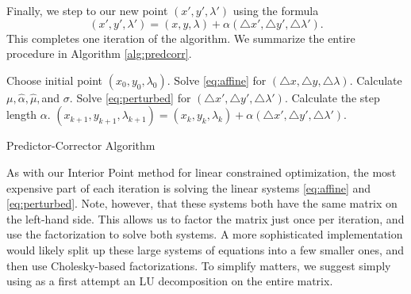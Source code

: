 Finally, we step to our new point $(x', y', \lambda')$ using the formula
\[
(x', y', \lambda') = (x, y, \lambda) + \alpha(\triangle x', \triangle y', \triangle \lambda').
\]
This completes one iteration of the algorithm.
We summarize the entire procedure in Algorithm \ref{alg:predcorr}.
\begin{algorithm}
\begin{algorithmic}[1]
    \State \textrm{Choose initial point } $(x_0, y_0, \lambda_0)$.
        \State \textrm{Solve \ref{eq:affine} for } $(\triangle x, \triangle y, \triangle \lambda)$.
        \State \textrm{Calculate } $\mu, \hat{\alpha}, \hat{\mu},$\textrm{and} $\sigma$.
        \State \textrm{Solve \ref{eq:perturbed} for } $(\triangle x', \triangle y',\triangle \lambda')$.
        \State \textrm{Calculate the step length } $\alpha$.
        \State $(x_{k+1}, y_{k+1}, \lambda_{k+1}) = (x_k, y_k, \lambda_k) + \alpha(\triangle x', \triangle y', \triangle \lambda').$
    \EndFor
\EndProcedure
\end{algorithmic}
\caption{Predictor-Corrector Algorithm}
\label{alg:predcorr}
\end{algorithm}

As with our Interior Point method for linear constrained optimization, the most expensive part of each iteration
is solving the linear systems \ref{eq:affine} and \ref{eq:perturbed}. Note, however, that these systems both have
the same matrix on the left-hand side. This allows us to factor the matrix just once per iteration, and use the
factorization to solve both systems. A more sophisticated implementation would likely split up these large
systems of equations into a few smaller ones, and then use Cholesky-based factorizations. To simplify matters, we
suggest simply using as a first attempt an LU decomposition on the entire matrix.

